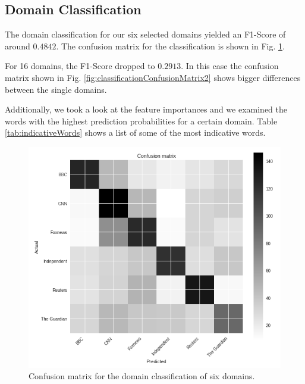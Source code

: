\documentclass[final]{ieee}
\begin{document}
\subsection{Domain Classification}\label{sec:domain classification results}

The domain classification for our six selected domains yielded an F1-Score of around $0.4842$. The confusion matrix for the classification is shown in Fig. \ref{fig:classificationConfusionMatrix}.

For 16 domains, the F1-Score dropped to $0.2913$. In this case the confusion matrix shown in Fig. \ref{fig:classificationConfusionMatrix2} shows bigger differences between the single domains.

Additionally, we took a look at the feature importances and we examined the words with the highest prediction probabilities for a certain domain. Table \ref{tab:indicativeWords} shows a list of some of the most indicative words.

\begin{figure}[!hbt]
  \centering
    \includegraphics[width=\columnwidth]{classificationConfusionMatrix.png}
    \caption{Confusion matrix for the domain classification of six domains.}
  \label{fig:classificationConfusionMatrix}
\end{figure}
\end{document}
